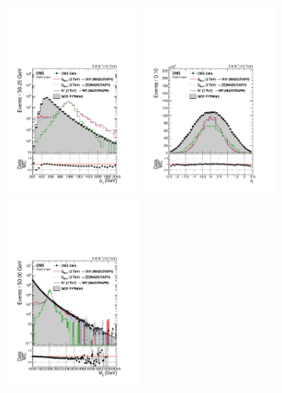 \begin{figure}[h!]
\centering
\includegraphics[width=0.4\textwidth]{figures/analysis/search1/AN-15-211/controlplots/silverjson/Pt_WSignal.pdf}
\includegraphics[width=0.4\textwidth]{figures/analysis/search1/AN-15-211/controlplots/silverjson/Eta_WSignal.pdf}\\
\includegraphics[width=0.4\textwidth]{figures/analysis/search1/AN-15-211/controlplots/silverjson/Mjj_WSignal.pdf}

\end{figure}
